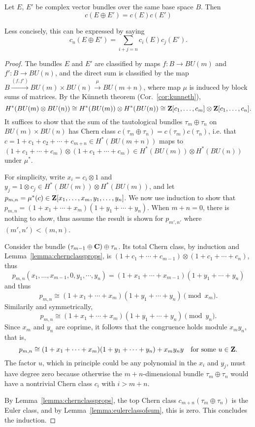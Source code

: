 \documentclass[a4paper,openany]{scrbook}
\begin{document}
\begin{lemma} \label{lemma:Whitneysumformula}
Let $E$, $E'$ be complex vector bundles over the same base space $B$. Then
\[
c(E \oplus E') = c(E) c(E')
\]
\end{lemma}
Less concisely, this can be expressed by saying
\[
c_n(E \oplus E') = \sum_{i+j=n} c_i(E) c_j(E').
\]
\begin{proof}
The bundles $E$ and $E'$ are classified by maps $f\colon B \to BU(m)$ and $f'\colon B \to BU(n)$, and the direct sum is classified by the map $B \xrightarrow{(f,f')} BU(m) \times BU(n) \xrightarrow{\mu} BU(m+n)$, where map $\mu$ is induced by block sums of matrices. By the K\"unneth theorem (Cor.~\ref{cor:kunneth}), 
\[
H^*(BU(m) \otimes BU(n)) \cong H^*(BU(m)) \otimes H^*(BU(n)) \cong \mathbf Z[c_1,\dots,c_m] \otimes \mathbf Z[c_1,\dots,c_n].
\]
It suffices to show that the sum of the tautological bundles $\tau_m \oplus \tau_n$ on $BU(m) \times BU(n)$ has Chern class $c(\tau_m \oplus \tau_n) = c(\tau_m) c(\tau_n)$, i.e. that $c=1+c_1+c_2+\cdots+c_{m+n} \in H^*(BU(m+n))$ maps to $(1+c_1+\cdots+c_m) \otimes (1+c_1+\cdots+c_m) \in H^*(BU(m)) \otimes H^*(BU(n))$ under $\mu^*$.

For simplicity, write $x_i = c_i \otimes 1$ and $y_j = 1 \otimes c_j \in H^*(BU(m)) \otimes H^*(BU(m))$, and let $p_{m,n} = \mu^*(c) \in \mathbf Z[x_1,\dots,x_m,y_1,\dots,y_n]$. We now use induction to show that $p_{m,n} = (1+x_1+\cdots+x_m)(1+y_1+\cdots+y_n)$. When $m+n=0$, there is nothing to show, thus assume the result is shown for $p_{m',n'}$ where $(m',n')<(m,n)$.

Consider the bundle $(\tau_{m-1} \oplus \mathbf C) \oplus \tau_n$. Its total Chern class, by induction and Lemma~\ref{lemma:chernclassprops}, is $(1+c_1+\cdots+c_{m-1})\otimes(1+c_1+\cdots+c_n)$, thus
\[
p_{m,n}(x_1,\dots,x_{m-1},0,y_1,\cdots,y_n) = (1+x_1+\cdots+x_{m-1})(1+y_1+\cdots+y_n)
\]
and thus
\[
p_{m,n} \cong (1+x_1+\cdots+x_m)(1+y_1+\cdots+y_n) \pmod{x_m}.
\]
Similarily and symmetrically, 
\[
p_{m,n} \cong (1+x_1+\cdots+x_m)(1+y_1+\cdots+y_n) \pmod{y_n}.
\]
Since $x_m$ and $y_n$ are coprime, it follows that the congruence holds module $x_my_n$, that is,
\[
p_{m,n} \cong (1+x_1+\cdots+x_m)(1+y_1+\cdots+y_n)+ x_my_n y \quad \text{for some } u \in \mathbf Z.
\]
The factor $u$, which in principle could be any polynomial in the $x_i$ and $y_j$, must have degree zero because otherwise the $m+n$-dimensional bundle $\tau_m \oplus \tau_n$ would have a nontrivial Chern class $c_i$ with $i>m+n$.

By Lemma~\ref{lemma:chernclassprops}, the top Chern class $c_{m+n}(\tau_m \oplus \tau_n)$ is the Euler class, and by Lemma~\ref{lemma:eulerclassofsum}, this is zero. This concludes the induction.
\end{proof}
\end{document}
